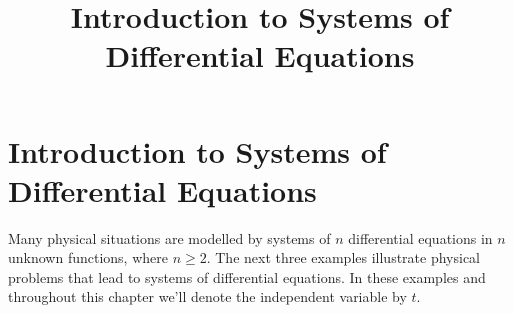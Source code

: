 \documentclass{ximera}
\title{Introduction to Systems of Differential Equations}%
\begin{document}
\begin{abstract}

\end{abstract}

\maketitle

\section*{Introduction to Systems of Differential Equations}

Many physical situations are modelled by systems of $n$ differential equations
in $n$ unknown functions, where $n\geq 2$. The next three examples
illustrate physical problems that lead to systems of differential
equations. In these examples and throughout this chapter we'll
denote the independent variable by $t$.
\end{document}
